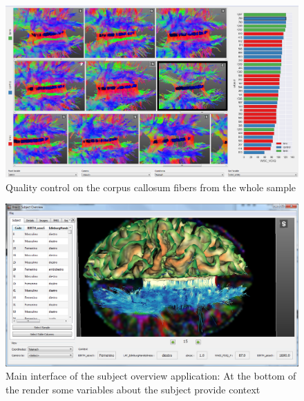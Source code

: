 \documentclass{frontiersHLTH}
\begin{document}
\begin{figure}
\begin{center}
\includegraphics[width=\linewidth]{quality_control_trim}
\end{center}
 \caption{\label{fig_sample} Quality control on the corpus callosum fibers from the whole sample}
\end{figure}


\begin{figure}
\begin{center}
\includegraphics[width=\linewidth]{subj_overview_full}
\end{center}
 \caption{\label{fig_subject}Main interface of the subject overview application: At the bottom of the render some variables about the subject provide context}
\end{figure}
\end{document}
